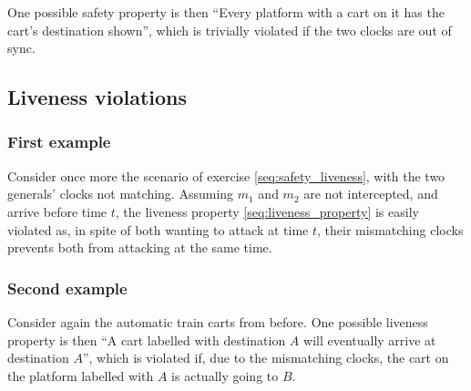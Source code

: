 \documentclass[a4paper]{scrreprt}
\begin{document}
One possible safety property is then ``Every platform with a cart on it has the
cart's destination shown'', which is trivially violated if the two clocks are
out of sync.

\subsection{Liveness violations}

\subsubsection{First example}

Consider once more the scenario of exercise \ref{seq:safety_liveness}, with the
two generals' clocks not matching. Assuming $m_1$ and $m_2$ are not
intercepted, and arrive before time $t$, the liveness property
\ref{seq:liveness_property} is easily violated as, in spite of both wanting to
attack at time $t$, their mismatching clocks prevents both from attacking at
the same time.

\subsubsection{Second example}

Consider again the automatic train carts from before. One possible liveness
property is then ``A cart labelled with destination $A$ will eventually arrive
at destination $A$'', which is violated if, due to the mismatching clocks, the
cart on the platform labelled with $A$ is actually going to $B$.
\end{document}

